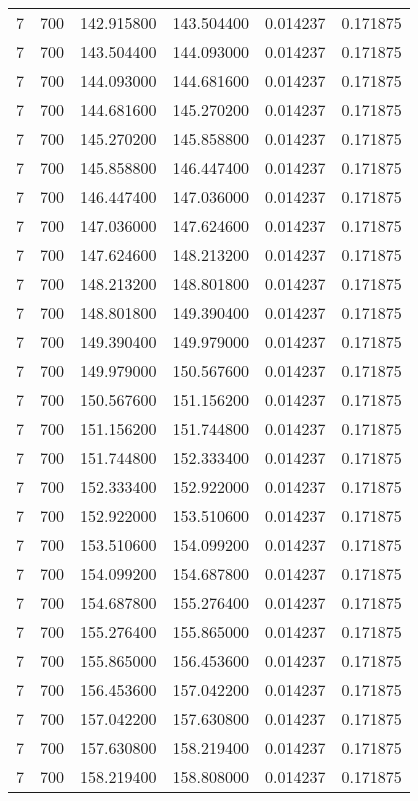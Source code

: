 \begin{longtable}{rrrrrr}
7 & 700 & 142.915800 & 143.504400 & 0.014237 & 0.171875 \\
7 & 700 & 143.504400 & 144.093000 & 0.014237 & 0.171875 \\
7 & 700 & 144.093000 & 144.681600 & 0.014237 & 0.171875 \\
7 & 700 & 144.681600 & 145.270200 & 0.014237 & 0.171875 \\
7 & 700 & 145.270200 & 145.858800 & 0.014237 & 0.171875 \\
7 & 700 & 145.858800 & 146.447400 & 0.014237 & 0.171875 \\
7 & 700 & 146.447400 & 147.036000 & 0.014237 & 0.171875 \\
7 & 700 & 147.036000 & 147.624600 & 0.014237 & 0.171875 \\
7 & 700 & 147.624600 & 148.213200 & 0.014237 & 0.171875 \\
7 & 700 & 148.213200 & 148.801800 & 0.014237 & 0.171875 \\
7 & 700 & 148.801800 & 149.390400 & 0.014237 & 0.171875 \\
7 & 700 & 149.390400 & 149.979000 & 0.014237 & 0.171875 \\
7 & 700 & 149.979000 & 150.567600 & 0.014237 & 0.171875 \\
7 & 700 & 150.567600 & 151.156200 & 0.014237 & 0.171875 \\
7 & 700 & 151.156200 & 151.744800 & 0.014237 & 0.171875 \\
7 & 700 & 151.744800 & 152.333400 & 0.014237 & 0.171875 \\
7 & 700 & 152.333400 & 152.922000 & 0.014237 & 0.171875 \\
7 & 700 & 152.922000 & 153.510600 & 0.014237 & 0.171875 \\
7 & 700 & 153.510600 & 154.099200 & 0.014237 & 0.171875 \\
7 & 700 & 154.099200 & 154.687800 & 0.014237 & 0.171875 \\
7 & 700 & 154.687800 & 155.276400 & 0.014237 & 0.171875 \\
7 & 700 & 155.276400 & 155.865000 & 0.014237 & 0.171875 \\
7 & 700 & 155.865000 & 156.453600 & 0.014237 & 0.171875 \\
7 & 700 & 156.453600 & 157.042200 & 0.014237 & 0.171875 \\
7 & 700 & 157.042200 & 157.630800 & 0.014237 & 0.171875 \\
7 & 700 & 157.630800 & 158.219400 & 0.014237 & 0.171875 \\
7 & 700 & 158.219400 & 158.808000 & 0.014237 & 0.171875 \\

\end{longtable}
